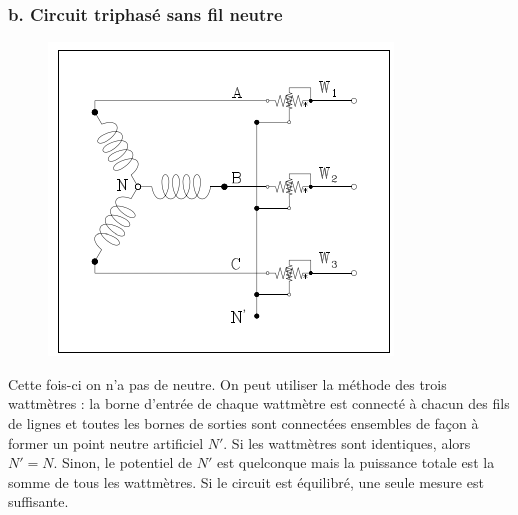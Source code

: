 \subsubsection{b. Circuit triphasé sans fil neutre}
\begin{figure}
	\vspace{-5mm}
	\includegraphics[scale=0.35]{ch1/image13.png}
\end{figure}		
Cette fois-ci on n'a pas de neutre. On peut utiliser la méthode des 
trois wattmètres : la borne d'entrée de chaque wattmètre est connecté 
à chacun des fils de lignes et toutes les bornes de sorties sont 
connectées ensembles de façon à former un point neutre artificiel $N'$. 
Si les wattmètres sont identiques, alors $N'=N$. Sinon, le potentiel 
de $N'$ est quelconque mais la puissance totale est la somme de tous 
les wattmètres. Si le circuit est équilibré, une seule mesure est 
suffisante.\\
		
				
		
